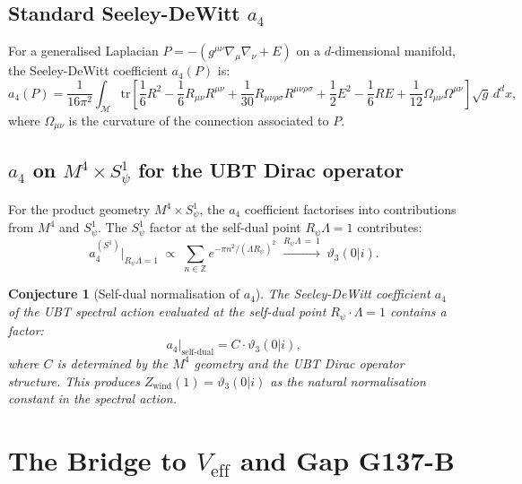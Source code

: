 \documentclass[12pt,a4paper]{article}
\newtheorem{conjecture}[theorem]{Conjecture}
\theoremstyle{remark}
\begin{document}
\subsection{Standard Seeley-DeWitt $a_4$}

For a generalised Laplacian $P = -(g^{\mu\nu}\nabla_\mu\nabla_\nu + E)$
on a $d$-dimensional manifold, the Seeley-DeWitt coefficient $a_4(P)$ is:
\begin{equation}
  a_4(P) = \frac{1}{16\pi^2}\int_{\mathcal{M}}
  \mathrm{tr}\!\left[\frac{1}{6}R^2 - \frac{1}{6}R_{\mu\nu}R^{\mu\nu}
  + \frac{1}{30}R_{\mu\nu\rho\sigma}R^{\mu\nu\rho\sigma}
  + \frac{1}{2}E^2 - \frac{1}{6}RE + \frac{1}{12}\Omega_{\mu\nu}\Omega^{\mu\nu}
  \right]\sqrt{g}\,d^dx,
  \label{eq:a4_standard}
\end{equation}
where $\Omega_{\mu\nu}$ is the curvature of the connection associated to $P$.

\subsection{$a_4$ on $M^4\times S^1_\psi$ for the UBT Dirac operator}

For the product geometry $M^4\times S^1_\psi$, the $a_4$ coefficient factorises
into contributions from $M^4$ and $S^1_\psi$. The $S^1_\psi$ factor at the
self-dual point $R_\psi\Lambda=1$ contributes:
\begin{equation}
  a_4^{(S^1)}\big|_{R_\psi\Lambda=1}
  \;\propto\; \sum_{n\in\mathbb{Z}} e^{-\pi n^2/(\Lambda R_\psi)^2}
  \;\xrightarrow{R_\psi\Lambda\,=\,1}\;
  \vartheta_3(0|i).
  \label{eq:a4_S1_contribution}
\end{equation}

\begin{conjecture}[Self-dual normalisation of $a_4$]
\label{conj:a4_theta3}
The Seeley-DeWitt coefficient $a_4$ of the UBT spectral action evaluated at
the self-dual point $R_\psi\cdot\Lambda = 1$ contains a factor:
\begin{equation}
  a_4\big|_{\mathrm{self\text{-}dual}}
  = C\cdot\vartheta_3(0|i),
\end{equation}
where $C$ is determined by the $M^4$ geometry and the UBT Dirac operator
structure.  This produces $Z_{\mathrm{wind}}(1) = \vartheta_3(0|i)$ as the
natural normalisation constant in the spectral action.
\end{conjecture}

\section{The Bridge to $V_{\mathrm{eff}}$ and Gap G137-B}
\label{sec:bridge}
\end{document}
